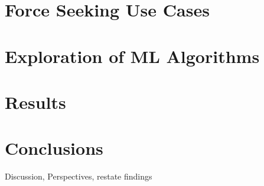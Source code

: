\documentclass[english]{spimubphdthesis}
\begin{document}
\section{Force Seeking Use Cases}
\section{Exploration of ML Algorithms}
\section{Results}
\section{Conclusions}
Discussion, Perspectives, restate findings


%
%
%
%
%
%
\end{document}
